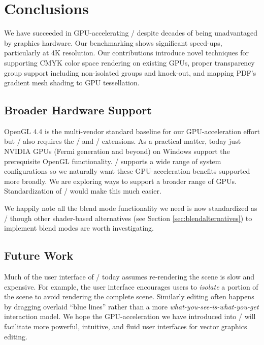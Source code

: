
\section{Conclusions}
\label{sec:conclusion}

We have succeeded in GPU-accelerating \Illustrator/ despite
decades of being unadvantaged by graphics hardware.  Our
benchmarking shows significant speed-ups, particularly at 4K resolution.
Our contributions introduce novel techniques for supporting CMYK color
space rendering on existing GPUs, proper transparency group support
including non-isolated groups and knock-out, and mapping PDF's gradient
mesh shading to GPU tessellation.

\subsection{Broader Hardware Support}
\label{sec:standardization}

OpenGL 4.4 is the multi-vendor standard baseline for our GPU-acceleration
effort but \Illustrator/ also requires the \NVpr/ and \KHRbea/
extensions.  As a practical matter, today just NVIDIA GPUs (Fermi
generation \cite{Fermi} and beyond) on Windows support the prerequisite
OpenGL functionality.  \Illustrator/ supports a wide range
of system configurations so we
naturally want these GPU-acceleration benefits supported more broadly.
We are exploring ways to support a broader range of GPUs.
Standardization of \NVpr/ would make this much easier.

\ifdefined\NOSHOW
We happily note all the blend mode functionality we need
is now standardized as \KHRbea/ \cite{KHRbeaSpec} though other shader-based
alternatives (see Section \ref{sec:blendalternatives}) to implement blend modes are worth investigating.
\fi

\subsection{Future Work}
\label{sec:futurework}

Much of the user interface of \Illustrator/ today assumes
re-rendering the scene is slow and expensive.  For example, the
user interface encourages users to {\em isolate} a portion of the
scene to avoid rendering the complete scene.  Similarly editing
often happens by dragging overlaid ``blue lines'' rather than a more
{\em what-you-see-is-what-you-get} interaction model.  We hope the
GPU-acceleration we have introduced into \Illustrator/ will facilitate
more powerful, intuitive, and fluid user interfaces for vector graphics
editing.

